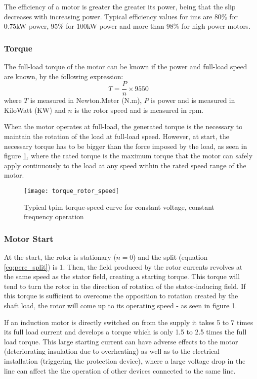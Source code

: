 The efficiency of a motor is greater the greater its power, being that the slip decreases with increasing power. Typical efficiency values for \acrshort{ims} are 80\% for 0.75kW power, 95\% for 100kW power and more than 98\% for high power motors.

\subsubsection{Torque}

The full-load torque of the motor can be known if the power and full-load speed are known, by the following expression:
\begin{equation} \label{eq:efficiency_max}
	T = \frac{P}{n}\times 9550
\end{equation}
where $T$ is measured in Newton.Meter (N.m), $P$ is power and is measured in KiloWatt (KW) and $n$ is the rotor speed and is measured in rpm.

When the motor operates at full-load, the generated torque is the necessary to maintain the rotation of the load at full-load speed. However, at start, the necessary torque has to be bigger than the force imposed by the load, as seen in figure \ref{fig:torque_speed_curve}, where the rated torque is the maximum torque that the motor can safely apply continuously to the load at any speed within the rated speed range of the motor.

\begin{figure}[htbp]
	\centering
	\texttt{[image: torque\_rotor\_speed]}
	\caption{Typical \acrshort{tpim} torque-speed curve for constant voltage, constant frequency operation}
	\label{fig:torque_speed_curve}
\end{figure}

\subsubsection{Motor Start}

At the start, the rotor is stationary ($n = 0$) and the split (equation \ref{eq:perc_split}) is 1. Then, the field produced by the rotor currents revolves at the same speed as the stator field, creating a starting torque. 
This torque will tend to turn the rotor in the direction of rotation of the stator-inducing field. If this torque is sufficient to overcome the opposition to rotation created by the shaft load, the rotor will come up to its operating speed - as seen in figure \ref{fig:torque_speed_curve}.

If an induction motor is directly switched on from the supply it takes 5 to 7 times its full load current and develops a torque which is only 1.5 to 2.5 times the full load torque. 
This large starting current can have adverse effects to the motor (deteriorating insulation due to overheating) as well as to the electrical installation (triggering the protection device), where a large voltage drop in the line can affect the the operation of other devices connected to the same line.

